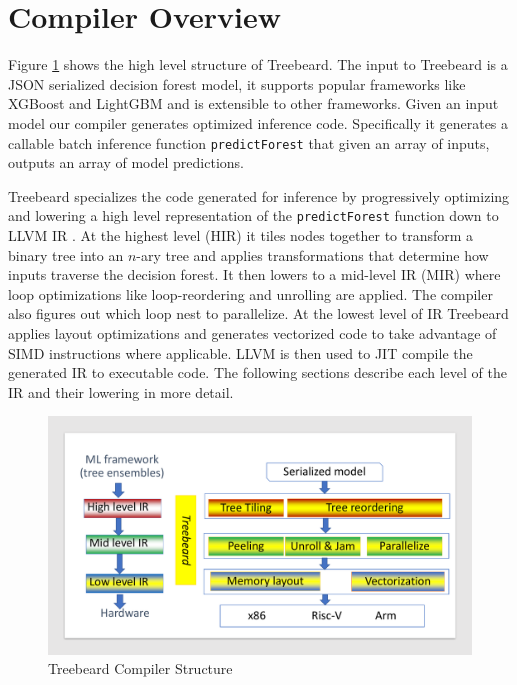 \section{Compiler Overview}
Figure \ref{Fig:CompilerStructure} shows the high level structure of Treebeard. 
The input to Treebeard is a JSON serialized decision forest model, it supports popular frameworks like XGBoost and LightGBM and is extensible to other frameworks.
Given an input model our compiler generates optimized inference code. Specifically it generates a callable batch inference function \texttt{predictForest} that given an array of inputs, outputs an array of model predictions. 
 
Treebeard specializes the code generated for inference by progressively optimizing and lowering a high level representation of the \texttt{predictForest} function down to LLVM IR \cite{LLVM}.
At the highest level (HIR) it tiles nodes together to transform a binary tree into an $n$-ary tree and applies transformations that determine how inputs traverse the decision forest. It then lowers to a mid-level IR (MIR) where loop optimizations like loop-reordering and unrolling are applied. The compiler also figures out which loop nest to parallelize. At the lowest level of IR Treebeard applies layout optimizations and generates vectorized code to take advantage of SIMD instructions where applicable. 
LLVM is then used to JIT compile the generated IR to executable code. The following sections describe each level of the IR and their lowering in more detail.



\begin{figure}
  \centering
  \includegraphics[width=\linewidth]{figures/compiler.pdf}
  \caption{Treebeard Compiler Structure}
  \label{Fig:CompilerStructure}
\end{figure}

